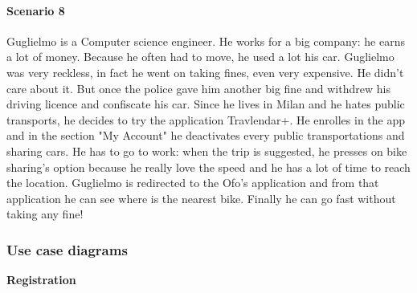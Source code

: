 \documentclass[12pt,titlepage]{article}
\begin{document}
\paragraph{Scenario 8}
Guglielmo is a Computer science engineer. He works for a big company: he earns a lot of money. Because he often had to move, he used a lot his car. Guglielmo was very reckless, in fact he went on taking fines, even very expensive. He didn't care about it. But once the police gave him another big fine and withdrew his driving licence and confiscate his car.
Since he lives in Milan and he hates public transports, he decides to try the application Travlendar+. He enrolles in the app and in the section "My Account" he deactivates every public transportations and sharing cars. He has to go to work: when the trip is suggested, he presses on bike sharing's option because he really love the speed and he has a lot of time to reach the location. Guglielmo is redirected to the Ofo's application and from that application he can see where is the nearest bike. Finally he can go fast without taking any fine!

\pagebreak
\subsubsection{Use case diagrams}\label{sec:mod1}
\begin{flushleft}
\textbf{Registration} 
\end{flushleft}
\end{document}
